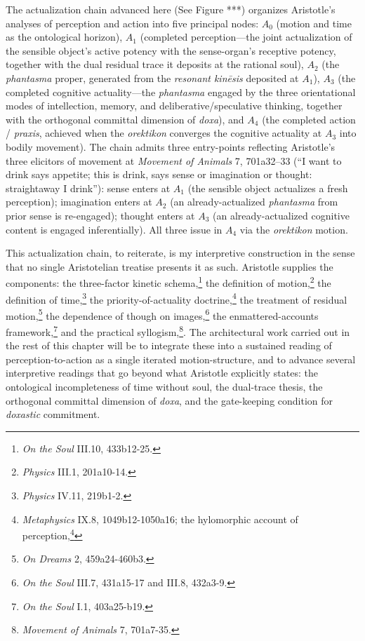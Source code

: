 \documentclass{article}
\begin{document}
The actualization chain advanced here (See Figure ***) organizes Aristotle's analyses of perception and action into five principal nodes: $A_0$ (motion and time as the ontological horizon), $A_1$ (completed perception---the joint actualization of the sensible object's active potency with the sense-organ's receptive potency, together with the dual residual trace it deposits at the rational soul), $A_2$ (the \textit{phantasma} proper, generated from the \textit{resonant kinēsis} deposited at $A_1$), $A_3$ (the completed cognitive actuality---the \textit{phantasma} engaged by the three orientational modes of intellection, memory, and deliberative/speculative thinking, together with the orthogonal committal dimension of \textit{doxa}), and $A_4$ (the completed action / \textit{praxis}, achieved when the \textit{orektikon} converges the cognitive actuality at $A_3$ into bodily movement). The chain admits three entry-points reflecting Aristotle's three elicitors of movement at \textit{Movement of Animals} 7, 701a32--33 (``I want to drink says appetite; this is drink, says sense or imagination or thought: straightaway I drink''): sense enters at $A_1$ (the sensible object actualizes a fresh perception); imagination enters at $A_2$ (an already-actualized \textit{phantasma} from prior sense is re-engaged); thought enters at $A_3$ (an already-actualized cognitive content is engaged inferentially). All three issue in $A_4$ via the \textit{orektikon} motion. 

This actualization chain, to reiterate, is my interpretive construction in the sense that no single Aristotelian treatise presents it as such. Aristotle supplies the components: the three-factor kinetic schema,\footnote{\textit{On the Soul} III.10, 433b12-25.} the definition of motion,\footnote{\textit{Physics} III.1, 201a10-14.} the definition of time,\footnote{\textit{Physics} IV.11, 219b1-2.} the priority-of-actuality doctrine,\footnote{\textit{Metaphysics} IX.8, 1049b12-1050a16; the hylomorphic account of perception,\footnote{\textit{On the Soul} II.12, 424a17-24.}} the treatment of residual motion,\footnote{\textit{On Dreams} 2, 459a24-460b3.} the dependence of though on images,\footnote{\textit{On the Soul} III.7, 431a15-17 and III.8, 432a3-9.} the enmattered-accounts framework,\footnote{\textit{On the Soul} I.1, 403a25-b19.} and the practical syllogism,\footnote{\textit{Movement of Animals} 7, 701a7-35.}. The architectural work carried out in the rest of this chapter will be to integrate these into a sustained reading of perception-to-action as a single iterated motion-structure, and to advance several interpretive readings that go beyond what Aristotle explicitly states: the ontological incompleteness of time without soul, the dual-trace thesis, the orthogonal committal dimension of \textit{doxa}, and the gate-keeping condition for \textit{doxastic} commitment. 
\end{document}
